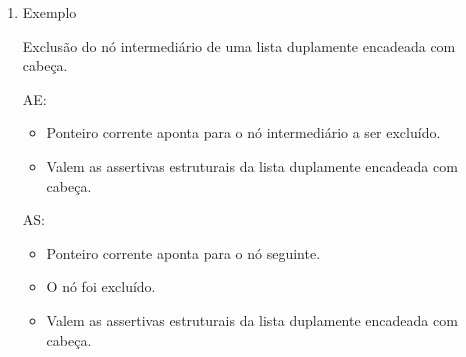 \documentclass[
	12pt, %
]{fphw}
\begin{document}
\begin{doublespace}
\begin{enumerate}
    \item Exemplo
    
    Exclusão do nó intermediário de uma lista duplamente encadeada com cabeça.

    AE:

    \begin{itemize}
        \item Ponteiro corrente aponta para o nó intermediário a ser excluído.
        \item Valem as assertivas estruturais da lista duplamente encadeada com cabeça.
    \end{itemize}

    AS:

    \begin{itemize}
        \item Ponteiro corrente aponta para o nó seguinte.
        \item O nó foi excluído.
        \item Valem as assertivas estruturais da lista duplamente encadeada com cabeça.
    \end{itemize}

\end{enumerate}

\end{doublespace}
\end{document}
